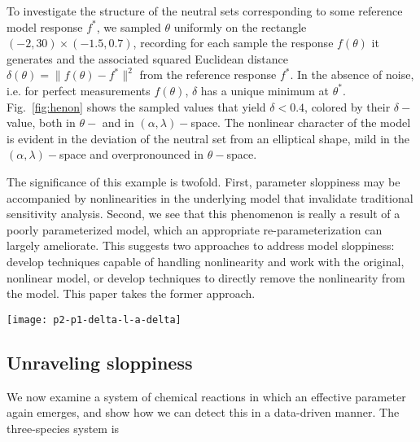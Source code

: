 To investigate the structure of the neutral sets corresponding to some
reference model response $f^*$, we sampled $\theta$
uniformly on the rectangle $(-2, 30) \times (-1.5, 0.7)$, recording
for each sample the response $f(\theta)$ it generates and
the associated squared Euclidean distance
$\delta(\theta) = \| f(\theta) - f^* \|^2$
from the reference response $f^*$.  In the absence of noise,
i.e. for perfect measurements $f(\theta)$, $\delta$ has a
unique minimum at $\theta^*$.  Fig.~\ref{fig:henon} shows the
sampled values that yield $\delta<0.4$, colored by their
$\delta-$value, both in $\theta-$ and in $(\alpha,\lambda)-$space.
The nonlinear character of the model is evident in the deviation of
the neutral set from an elliptical shape, mild in the
$(\alpha,\lambda)-$space and overpronounced in $\theta-$space.

The significance of this example is twofold.  First, parameter
sloppiness may be accompanied by nonlinearities in the underlying
model that invalidate traditional sensitivity analysis.  Second, we
see that this phenomenon is really a result of a poorly parameterized
model, which an appropriate re-parameterization can largely
ameliorate.  This suggests two approaches to address model sloppiness:
develop techniques capable of handling nonlinearity and work with the
original, nonlinear model, or develop techniques to directly remove
the nonlinearity from the model.  This paper takes the former
approach.

\begin{figure*}[ht!]
  \centering
  \texttt{[image: p2-p1-delta-l-a-delta]}
  \caption[H\'{e}non map transformed parameters and original
  parameters in nonlinear singularly perturbed system]{Parameter space colored by $\delta$; all points satisfy $\delta<0.4$. H\'{e}non map transformed parameters $w_4$ and $u_4$ (left), and original parameters $\alpha$ and $\lambda$ (right). Here, we used the classical values  $(\gamma,\zeta) = (1.4,0.3)$ for the H\'{e}non map. The central point at $\delta=0$ corresponds to $(\lambda^*, a^*) = (1, 1)$.
    \label{fig:henon} }
\end{figure*}

\subsection{Unraveling sloppiness} \label{sec:rr} 

We now examine a system of chemical reactions in which an effective
parameter again emerges, and show how we can detect this in a
data-driven manner. The three-species system is


